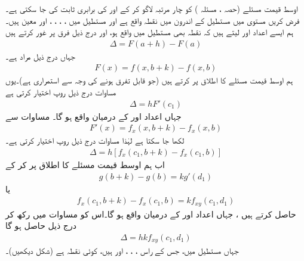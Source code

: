  اوسط  قیمت مسئلے  (حصہ ،  مسئلہ  )  کو چار مرتبہ لاگو کر کے   اور  کی  برابری  ثابت کی جا سکتی ہے۔  فرض کریں     مستوی  میں مستطیل  کے اندرون میں  نقطہ    واقع  ہے اور   مستطیل   میں  ، ، ، ، اور       معین ہیں۔ ہم ایسے اعداد  اور   لیتے ہیں کہ نقطہ   بھی مستطیل  میں واقع ہو، اور درج ذیل فرق پر غور کرتے ہیں
\begin{align}\label{مساوات_ضمیمہ_یولر_الف}
\Delta=F(a+h)-F(a)
\end{align}
جہاں درج ذیل مراد ہے۔
\begin{align}\label{مساوات_ضمیمہ_یولر_ب}
F(x)=f(x,b+k)-f(x,b)
\end{align}
ہم اوسط قیمت مسئلے کا اطلاق  پر کرتے ہیں (جو قابل تفرق ہونے کی وجہ سے استمراری ہے)۔یوں مساوات  درج ذیل روپ اختیار کرتی ہے
\begin{align}\label{مساوات_ضمیمہ_یولر_پ}
\Delta=hF'(c_1)
\end{align}
جہاں   اعداد   اور   کے  درمیان واقع ہو گا۔ مساوات  سے 
\begin{align*}
F'(x)=f_x(x,b+k)-f_x(x,b)
\end{align*}
لکھا جا سکتا ہے لہٰذا  مساوات  درج ذیل روپ اختیار کرتی ہے۔
\begin{align}\label{مساوات_ضمیمہ_یولر_ت}
\Delta=h[f_x(c_1,b+k)-f_x(c_1,b)]
\end{align}
اب ہم اوسط قیمت مسئلے کا اطلاق  پر کر کے 
\begin{align*}
g(b+k)-g(b)=kg'(d_1)
\end{align*}
یا
\begin{align*}
f_x(c_1,b+k)-f_x(c_1,b)=kf_{xy}(c_1, d_1)
\end{align*}
حاصل کرتے ہیں ، جہاں   اعداد  اور  کے درمیان واقع ہو گا۔اس کو مساوات  میں رکھ   کر درج ذیل حاصل ہو گا
\begin{align}\label{مساوات_ضمیمہ_یولر_ٹ}
\Delta=hkf_{xy}(c_1,d_1)
\end{align}
جہاں   مستطیل  میں، جس کے راس ، ، ، اور  ہیں،    کوئی نقطہ ہے (شکل  دیکھیں)۔

